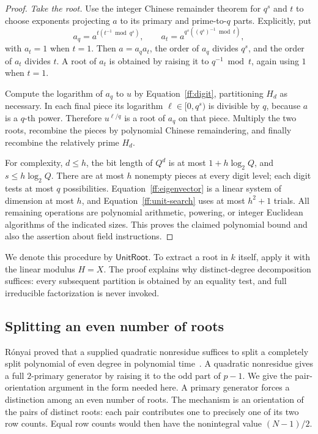 \begin{proof}
\smallskip
\noindent\emph{Take the root.}
Use the integer Chinese remainder theorem for $q^s$ and $t$ to choose
exponents projecting $a$ to its primary and prime-to-$q$ parts.  Explicitly,
put
\[
 a_q=a^{t(t^{-1}\bmod q^s)},\qquad
 a_t=a^{q^s((q^s)^{-1}\bmod t)},
\]
with $a_t=1$ when $t=1$.  Then $a=a_q a_t$, the order of $a_q$ divides
$q^s$, and the order of $a_t$ divides $t$.  A root of $a_t$ is obtained by
raising it to $q^{-1}\bmod t$, again using $1$ when $t=1$.

Compute the logarithm of $a_q$ to $u$ by Equation~\eqref{ff:digit},
partitioning $H_d$ as necessary.  In each final piece its logarithm
$\ell\in[0,q^s)$ is divisible by $q$, because $a$ is a $q$-th power.
Therefore $u^{\ell/q}$ is a root of $a_q$ on that piece.  Multiply the two
roots, recombine the pieces by polynomial Chinese remaindering, and finally
recombine the relatively prime $H_d$.

For complexity, $d\le h$, the bit length of $Q^d$ is at most $1+h\log_2Q$,
and $s\le h\log_2Q$.  There are at most $h$ nonempty pieces at every digit
level; each digit tests at most $q$ possibilities.  Equation~\eqref{ff:eigenvector}
is a linear system of dimension at most $h$, and
Equation~\eqref{ff:unit-search} uses at most $h^2+1$ trials.  All remaining
operations are polynomial arithmetic, powering, or integer Euclidean
algorithms of the indicated sizes.  This proves the claimed polynomial
bound and also the assertion about field instructions.
\end{proof}

We denote this procedure by $\mathsf{UnitRoot}$.  To extract a root in $k$
itself, apply it with the linear modulus $H=X$.  The proof explains why
distinct-degree decomposition suffices: every subsequent partition is obtained
by an equality test, and full irreducible factorization is never invoked.

\subsection{Splitting an even number of roots}

R\'onyai proved that a supplied quadratic nonresidue suffices to split
a completely split polynomial of even degree in polynomial time~\cite{Ronyai88}.
A quadratic nonresidue gives a full $2$-primary generator by raising it to
the odd part of $p-1$.  We give the pair-orientation argument in the form
needed here.  A primary generator forces a distinction among an even number of
roots.  The mechanism is an orientation of the pairs of distinct roots: each
pair contributes one to precisely one of its two row counts.  Equal row
counts would then have the nonintegral value $(N-1)/2$.

